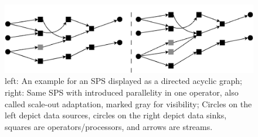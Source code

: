         \begin{figure}[h]
            \centering
            \includegraphics[width=1.0\textwidth]{Bilder/sps_parallel_normal.png}
            \caption{
                    left: An example for an SPS displayed as a directed acyclic graph;
                    right: Same SPS with introduced parallelity in one operator, also called scale-out adaptation, marked gray for visibility;
                    Circles on the left depict data sources, circles on the right depict data sinks, squares are operators/processors, and arrows are streams.
            }
            \label{fig:sps_parallel_normal}
        \end{figure}

        


        

